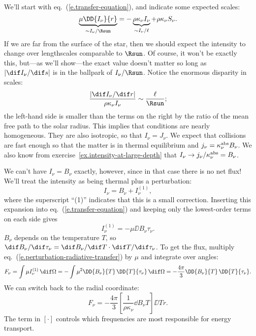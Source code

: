 We'll start with eq.~(\ref{e.transfer-equation}), and indicate some expected scales:
\[
\underbrace{\mu\DD{I_{\nu}}{r}}_{\sim I_{\nu}/\Rsun} = -\underbrace{\rho\kappa_{\nu} I_{\nu}}_{\sim I_{\nu}/\ell}  +\rho\kappa_{\nu} S_{\nu}.
\]
If we are far from the surface of the star, then we should expect the intensity to change over lengthscales comparable to $\Rsun$. Of course, it won't be exactly this, but---as we'll show---the exact value doesn't matter so long as $|\dif I_{\nu}/\dif s|$ is in the ballpark of $I_{\nu}/\Rsun$. Notice the enormous disparity in scales:
\[
	\frac{|\dif I_{\nu}/\dif r|}{\rho\kappa_{\nu}I_{\nu}} \sim \frac{\ell}{\Rsun};
\]
the left-hand side is smaller than the terms on the right by the ratio of the mean free path to the solar radius. This implies that conditions are nearly homogeneous. They are also isotropic, so that $I_{\nu} = J_{\nu}$. We expect that collisions are fast enough so that the matter is in thermal equilibrium and $j_{\nu} = \kappa_\nu^{\mathrm{abs}} B_{\nu}$. We also know from exercise~\ref{ex.intensity-at-large-depth} that $I_{\nu} \to j_{\nu}/\kappa_\nu^{\mathrm{abs}} = B_{\nu}$.

We can't have $I_{\nu} = B_{\nu}$ exactly, however, since in that case there is no net flux! We'll treat the intensity as being thermal plus a perturbation:
\[ I_{\nu} = B_{\nu} + I_{\nu}^{(1)}, \]
where the superscript ``(1)'' indicates that this is a small correction. Inserting this expansion into eq.~(\ref{e.transfer-equation}) and keeping only the lowest-order terms on each side gives
\begin{equation}\label{e.perturbation-radiative-transfer}
I_{\nu}^{(1)} = -\mu\DD{B_{\nu}}{\tau_{\nu}}.
\end{equation}
$B_{\nu}$ depends on the temperature $T$, so $\dif B_{\nu}/\dif\tau_{\nu} = \dif B_{\nu}/\dif T \cdot \dif T/\dif \tau_{\nu}$. To get the flux, multiply eq.~(\ref{e.perturbation-radiative-transfer}) by $\mu$ and integrate over angles:
\[ F_{\nu} = \int\mu I_{\nu}^{(1)}\,\dif\Omega = -\int \mu^{2}\DD{B_{\nu}}{T}\,\DD{T}{\tau_{\nu}}\,\dif \Omega = -\frac{4\pi}{3} \DD{B_{\nu}}{T}\,\DD{T}{\tau_{\nu}}. \]
We can switch back to the radial coordinate:
\begin{equation}\label{e.specific-radiative-transport}
	F_{\nu} = -\frac{4\pi}{3}\left[\frac{1}{\rho\kappa_{\nu}}\dd{B_{\nu}}{T}\right]\DD{T}{r}.
\end{equation}
The term in $\left[\cdot\right]$ controls which frequencies are most responsible for energy transport.

